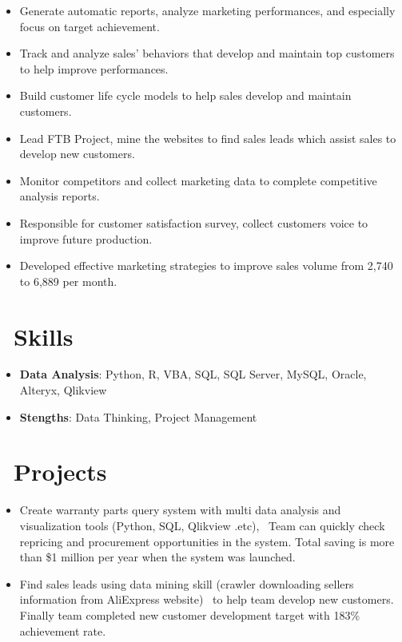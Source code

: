 \documentclass{resume}
\begin{document}
\begin{itemize}
    \item Generate automatic reports, analyze marketing performances, and especially focus on target achievement.
    \item Track and analyze sales' behaviors that develop and maintain top customers to help improve performances.
    \item Build customer life cycle models to help sales develop and maintain customers.
    \item Lead FTB Project, mine the websites to find sales leads which assist sales to develop new customers.
\end{itemize}

\begin{itemize}
    \item Monitor competitors and collect marketing data to complete competitive analysis reports.
    \item Responsible for customer satisfaction survey, collect customers voice to improve future production.
    \item Developed effective marketing strategies to improve sales volume from 2,740 to 6,889 per month.
\end{itemize}


\section{\faDiamond\ Skills}
\begin{itemize}[parsep=0.2ex]
  \item \textbf{Data Analysis}: Python, R, VBA, SQL, SQL Server, MySQL, Oracle, Alteryx, Qlikview
  \item \textbf{Stengths}: Data Thinking, Project Management
\end{itemize}

\section{\faCheckSquare\ Projects}
\begin{itemize}[parsep=0.6ex]
  \item Create warranty parts query system with multi data analysis and visualization tools (Python, SQL, Qlikview .etc), \
        Team can quickly check repricing and procurement opportunities in the system. Total saving is more than \$1 million per year when the system was launched.
  \item Find sales leads using data mining skill (crawler downloading sellers information from AliExpress website) \
        to help team develop new customers. Finally team completed new customer development target with 183\% achievement rate.
\end{itemize}


%
%
\end{document}
